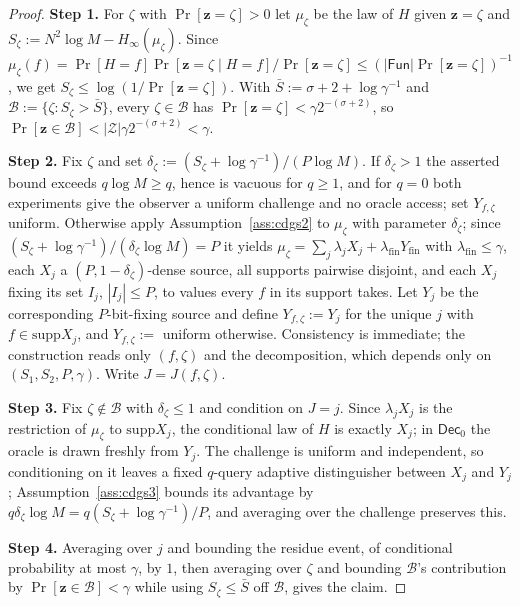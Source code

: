\documentclass{aicr-solution}
\newcommand{\Fun}{\mathsf{Fun}}
\newcommand{\Dec}{\mathsf{Dec}}
\newcommand{\Prob}[1]{\Pr\!\left[#1\right]}
\newcommand{\vz}{\mathbf{z}}
\newcommand{\supp}{\mathrm{supp}}
\begin{document}
\begin{proof}
\textbf{Step 1.} For $\zeta$ with $\Prob{\vz = \zeta} > 0$ let $\mu_\zeta$ be the
law of $H$ given $\vz = \zeta$ and $S_\zeta := N^{2}\log M - H_\infty(\mu_\zeta)$.
Since
$\mu_\zeta(f) = \Prob{H = f}\Prob{\vz = \zeta \mid H = f}/\Prob{\vz = \zeta}
\le (|\Fun|\Prob{\vz = \zeta})^{-1}$, we get
$S_\zeta \le \log(1/\Prob{\vz = \zeta})$. With
$\bar S := \sigma + 2 + \log\gamma^{-1}$ and
$\mathcal{B} := \{\zeta : S_\zeta > \bar S\}$, every $\zeta \in \mathcal{B}$ has
$\Prob{\vz = \zeta} < \gamma 2^{-(\sigma+2)}$, so
$\Prob{\vz \in \mathcal{B}} < |\mathcal{Z}|\gamma 2^{-(\sigma+2)} < \gamma$.

\textbf{Step 2.} Fix $\zeta$ and set
$\delta_\zeta := (S_\zeta + \log\gamma^{-1})/(P\log M)$. If $\delta_\zeta > 1$ the
asserted bound exceeds $q\log M \ge q$, hence is vacuous for $q \ge 1$, and for
$q = 0$ both experiments give the observer a uniform challenge and no oracle
access; set $Y_{f,\zeta}$ uniform. Otherwise apply Assumption~\ref{ass:cdgs2} to
$\mu_\zeta$ with parameter $\delta_\zeta$; since
$(S_\zeta + \log\gamma^{-1})/(\delta_\zeta \log M) = P$ it yields
$\mu_\zeta = \sum_j \lambda_j X_j + \lambda_{\mathrm{fin}}Y_{\mathrm{fin}}$ with
$\lambda_{\mathrm{fin}} \le \gamma$, each $X_j$ a $(P,1-\delta_\zeta)$-dense
source, all supports pairwise disjoint, and each $X_j$ fixing its set $I_j$,
$|I_j| \le P$, to values every $f$ in its support takes. Let $Y_j$ be the
corresponding $P$-bit-fixing source and define $Y_{f,\zeta} := Y_j$ for the unique
$j$ with $f \in \supp X_j$, and $Y_{f,\zeta} :=$ uniform otherwise. Consistency is
immediate; the construction reads only $(f,\zeta)$ and the decomposition, which
depends only on $(S_1,S_2,P,\gamma)$. Write $J = J(f,\zeta)$.

\textbf{Step 3.} Fix $\zeta \notin \mathcal{B}$ with $\delta_\zeta \le 1$ and
condition on $J = j$. Since $\lambda_j X_j$ is the restriction of $\mu_\zeta$ to
$\supp X_j$, the conditional law of $H$ is exactly $X_j$; in $\Dec_0$ the oracle is
drawn freshly from $Y_j$. The challenge is uniform and independent, so conditioning
on it leaves a fixed $q$-query adaptive distinguisher between $X_j$ and $Y_j$;
Assumption~\ref{ass:cdgs3} bounds its advantage by
$q\delta_\zeta \log M = q(S_\zeta + \log\gamma^{-1})/P$, and averaging over the
challenge preserves this.

\textbf{Step 4.} Averaging over $j$ and bounding the residue event, of conditional
probability at most $\gamma$, by $1$, then averaging over $\zeta$ and bounding
$\mathcal{B}$'s contribution by $\Prob{\vz \in \mathcal{B}} < \gamma$ while using
$S_\zeta \le \bar S$ off $\mathcal{B}$, gives the claim.
\end{proof}
\end{document}
